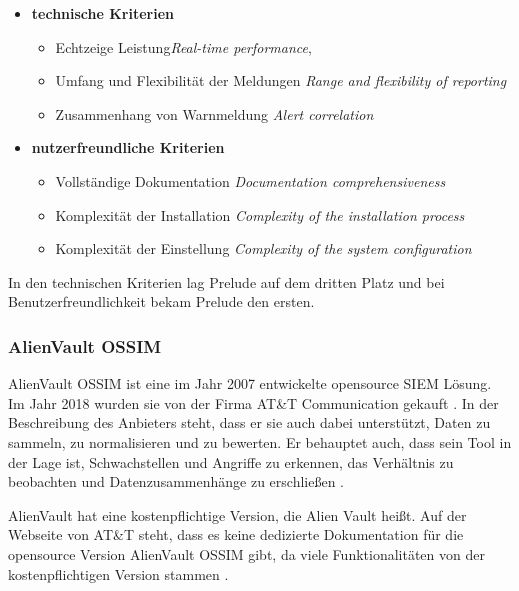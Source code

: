 \begin{itemize}[noitemsep]
   \item \textbf{technische Kriterien}
   \begin{itemize}[noitemsep]
      \item Echtzeige Leistung\textit{Real-time performance}, 
      \item Umfang und Flexibilität der Meldungen \textit{Range and flexibility of reporting}
      \item Zusammenhang von Warnmeldung \textit{Alert correlation}
   \end{itemize}

   \item \textbf{nutzerfreundliche Kriterien}
   \begin{itemize}[noitemsep]
      \item Vollständige Dokumentation \textit{Documentation comprehensiveness}
      \item Komplexität der Installation \textit{Complexity of the installation process}
      \item Komplexität der Einstellung \textit{Complexity of the system configuration}
   \end{itemize}
\end{itemize}

In den technischen Kriterien lag Prelude auf dem dritten Platz und bei Benutzerfreundlichkeit bekam Prelude den ersten. 


\subsubsection{AlienVault OSSIM}
AlienVault OSSIM ist eine im Jahr 2007 entwickelte \gls{opensource} \gls{SIEM} Lösung. Im Jahr 2018 wurden sie von der Firma AT\&T Communication gekauft  \citep{CBN_AV}. In der Beschreibung des Anbieters steht, dass er sie auch dabei unterstützt, Daten zu sammeln, zu normalisieren und zu bewerten. Er behauptet auch, dass sein Tool in der Lage ist, Schwachstellen und Angriffe zu erkennen, das Verhältnis zu beobachten und Datenzusammenhänge zu erschließen \citep{ATT_AVO}. 

AlienVault hat eine kostenpflichtige Version, die Alien Vault  heißt. Auf der Webseite von AT\&T steht, dass es keine dedizierte Dokumentation für die \gls{opensource} Version AlienVault OSSIM gibt, da viele Funktionalitäten von der kostenpflichtigen Version stammen \citep{ATT_AVO}. 

